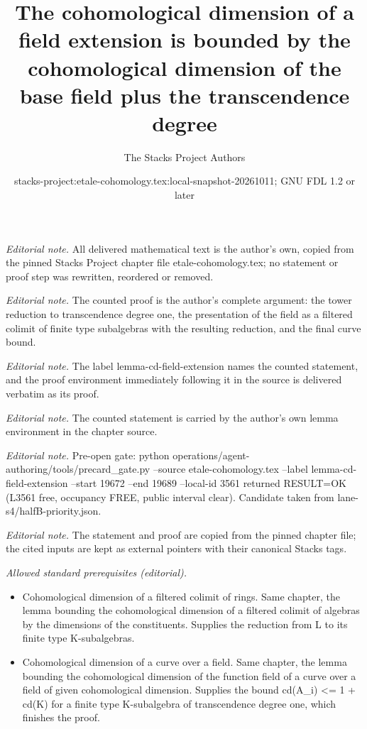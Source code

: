 \documentclass[10pt,a4paper]{amsart}
\title{The cohomological dimension of a field extension is bounded by the cohomological dimension of the base field plus the transcendence degree}
\author{The Stacks Project Authors}
\date{stacks-project:etale-cohomology.tex:local-snapshot-20261011; GNU FDL 1.2 or later}
\theoremstyle{plain}
\theoremstyle{definition}
\theoremstyle{remark}
\numberwithin{equation}{subsection}
\begin{document}
\maketitle
\noindent\textit{Editorial note.} All delivered mathematical text is the author's own, copied from the pinned Stacks Project chapter file etale-cohomology.tex; no statement or proof step was rewritten, reordered or removed.\par\medskip
\noindent\textit{Editorial note.} The counted proof is the author's complete argument: the tower reduction to transcendence degree one, the presentation of the field as a filtered colimit of finite type subalgebras with the resulting reduction, and the final curve bound.\par\medskip
\noindent\textit{Editorial note.} The label lemma-cd-field-extension names the counted statement, and the proof environment immediately following it in the source is delivered verbatim as its proof.\par\medskip
\noindent\textit{Editorial note.} The counted statement is carried by the author's own lemma environment in the chapter source.\par\medskip
\noindent\textit{Editorial note.} Pre-open gate: python operations/agent-authoring/tools/precard\_gate.py --source etale-cohomology.tex --label lemma-cd-field-extension --start 19672 --end 19689 --local-id 3561 returned RESULT=OK (L3561 free, occupancy FREE, public interval clear). Candidate taken from lane-s4/halfB-priority.json.\par\medskip
\noindent\textit{Editorial note.} The statement and proof are copied from the pinned chapter file; the cited inputs are kept as external pointers with their canonical Stacks tags.\par\medskip
\noindent\textit{Allowed standard prerequisites (editorial).}\begin{itemize}
\item Cohomological dimension of a filtered colimit of rings. Same chapter, the lemma bounding the cohomological dimension of a filtered colimit of algebras by the dimensions of the constituents. Supplies the reduction from L to its finite type K-subalgebras.
\item Cohomological dimension of a curve over a field. Same chapter, the lemma bounding the cohomological dimension of the function field of a curve over a field of given cohomological dimension. Supplies the bound cd(A\_i) <= 1 + cd(K) for a finite type K-subalgebra of transcendence degree one, which finishes the proof.
\end{itemize}\medskip
\end{document}
